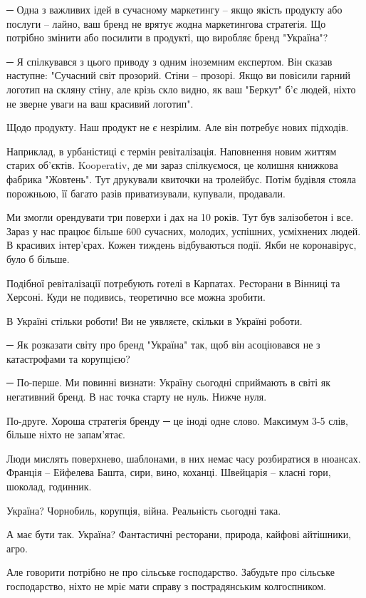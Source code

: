 ─ Одна з важливих ідей в сучасному маркетингу – якщо якість продукту або
послуги – лайно, ваш бренд не врятує жодна маркетингова стратегія. Що потрібно
змінити або посилити в продукті, що виробляє бренд "Україна"?

─ Я спілкувався з цього приводу з одним іноземним експертом. Він сказав
наступне: "Сучасний світ прозорий. Стіни – прозорі. Якщо ви повісили гарний
логотип на скляну стіну, але крізь скло видно, як ваш "Беркут" б’є людей, ніхто
не зверне уваги на ваш красивий логотип".

Щодо продукту. Наш продукт не є незрілим. Але він потребує нових підходів.

Наприклад, в урбаністиці є термін ревіталізація. Наповнення новим життям старих
об’єктів. Kooperativ, де ми зараз спілкуємося, це колишня книжкова фабрика
"Жовтень". Тут друкували квиточки на тролейбус. Потім будівля стояла порожньою,
її багато разів приватизували, купували, продавали. 

Ми змогли орендувати три поверхи і дах на 10 років. Тут був залізобетон і все.
Зараз у нас працює більше 600 сучасних, молодих, успішних, усміхнених людей. В
красивих інтер’єрах. Кожен тиждень відбуваються події. Якби не коронавірус,
було б більше.

Подібної ревіталізації потребують готелі в Карпатах. Ресторани в Вінниці та
Херсоні. Куди не подивись, теоретично все можна зробити.

В Україні стільки роботи! Ви не уявляєте, скільки в Україні роботи. 

─ Як розказати світу про бренд "Україна" так, щоб він асоціювався не з
катастрофами та корупцією?

─ По-перше. Ми повинні визнати: Україну сьогодні сприймають в світі як
негативний бренд. В нас точка старту не нуль. Нижче нуля.

По-друге. Хороша стратегія бренду ─ це іноді одне слово. Максимум 3-5 слів,
більше ніхто не запам’ятає.

Люди мислять поверхнево, шаблонами, в них немає часу розбиратися в нюансах.
Франція – Ейфелева Башта, сири, вино, коханці. Швейцарія – класні гори,
шоколад, годинник.

Україна? Чорнобиль, корупція, війна. Реальність сьогодні така. 

А має бути так. Україна? Фантастичні ресторани, природа, кайфові айтішники,
агро. 

Але говорити потрібно не про сільське господарство. Забудьте про сільське
господарство, ніхто не мріє мати справу з пострадянським колгоспником. 

